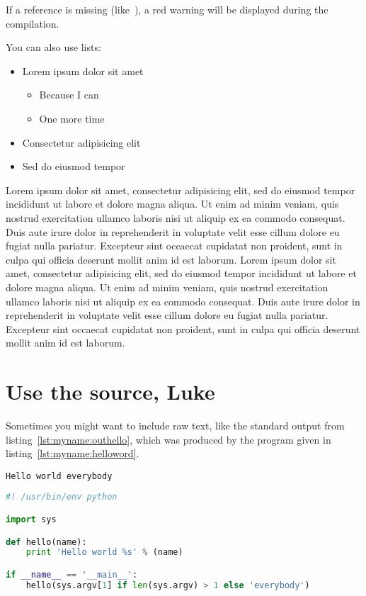 If a reference is missing (like~\cite{myname:referencefoireuse}), a
red warning will be displayed during the compilation.



You can also use lists:
\begin{itemize}
\item Lorem ipsum dolor sit amet
  \begin{itemize}
  \item Because I can
  \item One more time
  \end{itemize}
\item Consectetur adipisicing elit
\item Sed do eiusmod tempor
\end{itemize}

Lorem ipsum dolor sit amet, consectetur adipisicing elit, sed do
eiusmod tempor incididunt ut labore et dolore magna aliqua. Ut enim ad
minim veniam, quis nostrud exercitation ullamco laboris nisi ut
aliquip ex ea commodo consequat. Duis aute irure dolor in
reprehenderit in voluptate velit esse cillum dolore eu fugiat nulla
pariatur. Excepteur sint occaecat cupidatat non proident, sunt in
culpa qui officia deserunt mollit anim id est laborum. Lorem ipsum
dolor sit amet, consectetur adipisicing elit, sed do eiusmod tempor
incididunt ut labore et dolore magna aliqua. Ut enim ad minim veniam,
quis nostrud exercitation ullamco laboris nisi ut aliquip ex ea
commodo consequat. Duis aute irure dolor in reprehenderit in voluptate
velit esse cillum dolore eu fugiat nulla pariatur. Excepteur sint
occaecat cupidatat non proident, sunt in culpa qui officia deserunt
mollit anim id est laborum.

\section{Use the source, Luke}


Sometimes you might want to include raw text, like the standard output
from listing~\ref{lst:myname:outhello}, which was produced by the
program given in listing~\ref{lst:myname:helloword}.

\begin{lstlisting}[language={},caption={Standard output},label={lst:myname:outhello}]
Hello world everybody
\end{lstlisting}

\begin{lstlisting}[language={Python},caption={My first program},label={lst:myname:helloword}]
#! /usr/bin/env python

import sys

def hello(name):
    print 'Hello world %s' % (name)

if __name__ == '__main__':
    hello(sys.argv[1] if len(sys.argv) > 1 else 'everybody')
\end{lstlisting}

